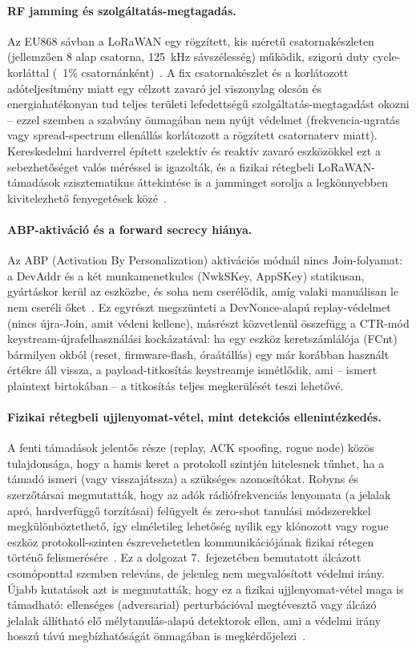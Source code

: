\documentclass[12pt,a4paper]{article}
\begin{document}
\paragraph{RF jamming és szolgáltatás-megtagadás.} Az EU868 sávban a
LoRaWAN egy rögzített, kis méretű csatornakészleten (jellemzően 8 alap
csatorna, 125~kHz sávszélesség) működik, szigorú duty cycle-korláttal (~1\%
csatornánként)~\cite{butun2018}. A fix csatornakészlet és a korlátozott
adóteljesítmény miatt egy célzott zavaró jel viszonylag olcsón és
energiahatékonyan tud teljes területi lefedettségű szolgáltatás-megtagadást
okozni -- ezzel szemben a szabvány önmagában nem nyújt védelmet
(frekvencia-ugratás vagy spread-spectrum ellenállás korlátozott a rögzített
csatornaterv miatt). Kereskedelmi hardverrel épített szelektív és reaktív
zavaró eszközökkel ezt a sebezhetőséget valós méréssel is igazolták, és a
fizikai rétegbeli LoRaWAN-támadások szisztematikus áttekintése is a
jamminget sorolja a legkönnyebben kivitelezhető fenyegetések
közé~\cite{ArasJam2017, Perkovi2021, Ruotsalainen2022}.

\paragraph{ABP-aktiváció és a forward secrecy hiánya.} Az ABP (Activation
By Personalization) aktivációs módnál nincs Join-folyamat: a DevAddr és a
két munkamenetkulcs (NwkSKey, AppSKey) statikusan, gyártáskor kerül az
eszközbe, és soha nem cserélődik, amíg valaki manuálisan le nem cseréli
őket~\cite{yang2018}. Ez egyrészt megszünteti a DevNonce-alapú
replay-védelmet (nincs újra-Join, amit védeni kellene), másrészt közvetlenül
összefügg a CTR-mód keystream-újrafelhasználási kockázatával: ha egy eszköz
keretszámlálója (FCnt) bármilyen okból (reset, firmware-flash, óraátállás)
egy már korábban használt értékre áll vissza, a payload-titkosítás
keystreamje ismétlődik, ami -- ismert plaintext birtokában -- a titkosítás
teljes megkerülését teszi lehetővé.

\paragraph{Fizikai rétegbeli ujjlenyomat-vétel, mint detekciós ellenintézkedés.}
A fenti támadások jelentős része (replay, ACK spoofing, rogue node) közös
tulajdonsága, hogy a hamis keret a protokoll szintjén hitelesnek tűnhet, ha a
támadó ismeri (vagy visszajátssza) a szükséges azonosítókat. Robyns és
szerzőtársai megmutatták, hogy az adók rádiófrekvenciás
lenyomata (a jelalak apró, hardverfüggő torzításai) felügyelt és zero-shot
tanulási módszerekkel megkülönböztethető, így elméletileg lehetőség nyílik
egy klónozott vagy rogue eszköz protokoll-szinten észrevehetetlen
kommunikációjának fizikai rétegen történő felismerésére~\cite{robyns2017}. Ez
a dolgozat 7.\ fejezetében bemutatott álcázott csomóponttal szemben releváns,
de jelenleg nem megvalósított védelmi irány. Újabb kutatások azt is
megmutatták, hogy ez a fizikai ujjlenyomat-vétel maga is támadható:
ellenséges (adversarial) perturbációval megtévesztő vagy álcázó jelalak
állítható elő mélytanulás-alapú detektorok ellen, ami a védelmi irány
hosszú távú megbízhatóságát önmagában is megkérdőjelezi~\cite{Sagduyu2023,
Sagduyu2025}.
\end{document}
